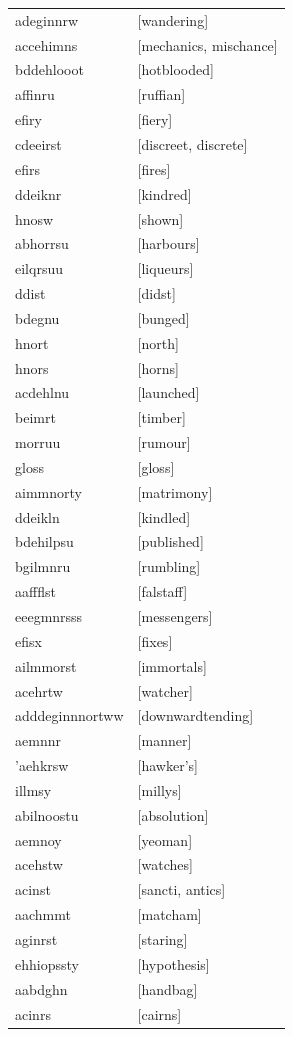 \documentclass{article}
\begin{document}
\begin{tabular}{ll}
adeginnrw & [wandering] \\
accehimns & [mechanics, mischance] \\
bddehlooot & [hotblooded] \\
affinru & [ruffian] \\
efiry & [fiery] \\
cdeeirst & [discreet, discrete] \\
efirs & [fires] \\
ddeiknr & [kindred] \\
hnosw & [shown] \\
abhorrsu & [harbours] \\
eilqrsuu & [liqueurs] \\
ddist & [didst] \\
bdegnu & [bunged] \\
hnort & [north] \\
hnors & [horns] \\
acdehlnu & [launched] \\
beimrt & [timber] \\
morruu & [rumour] \\
gloss & [gloss] \\
aimmnorty & [matrimony] \\
ddeikln & [kindled] \\
bdehilpsu & [published] \\
bgilmnru & [rumbling] \\
aaffflst & [falstaff] \\
eeegmnrsss & [messengers] \\
efisx & [fixes] \\
ailmmorst & [immortals] \\
acehrtw & [watcher] \\
adddeginnnortww & [downwardtending] \\
aemnnr & [manner] \\
'aehkrsw & [hawker's] \\
illmsy & [millys] \\
abilnoostu & [absolution] \\
aemnoy & [yeoman] \\
acehstw & [watches] \\
acinst & [sancti, antics] \\
aachmmt & [matcham] \\
aginrst & [staring] \\
ehhiopssty & [hypothesis] \\
aabdghn & [handbag] \\
acinrs & [cairns] \\

\end{tabular}
\end{document}
